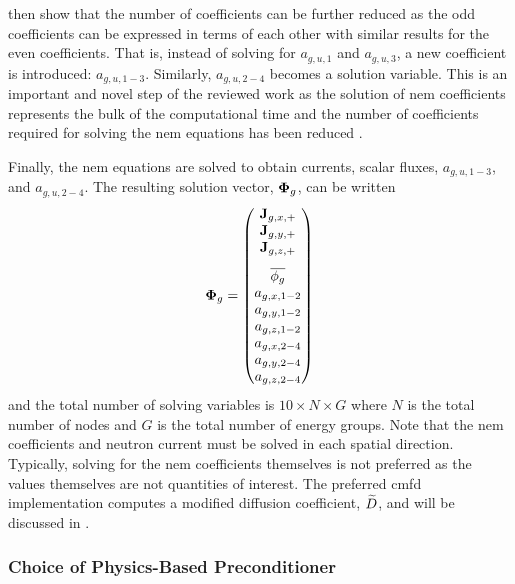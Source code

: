       \citeauthor{qe2paper} then show that the number of coefficients can be
      further reduced as the odd coefficients can be expressed in terms of
      each other with similar results for the even coefficients. That is,
      instead of solving for $a_{g,u,1}$ and $a_{g,u,3}$, a new coefficient is
      introduced: $a_{g,u,1-3}$. Similarly, $a_{g,u,2-4}$ becomes a solution
      variable. This is an important and novel step of the reviewed work as the
      solution of \gls{nem} coefficients represents the bulk of the
      computational time and the number of coefficients required for solving the
      \gls{nem} equations has been reduced \cite{qe2paper}.

      Finally, the \gls{nem} equations are solved to obtain currents, scalar
      fluxes, $a_{g,u,1-3}$, and $a_{g,u,2-4}$. The resulting solution vector,
      $\mathbf{\Phi}_g$, can be written 
      \begin{equation}
        \label{eq:solution_vector}
        \vPhi_g =
        \begin{pmatrix}
          \current_{g,x,+} \\
          \current_{g,y,+} \\
          \vspace{8pt}
          \current_{g,z,+} \\
          \overline{\phi_g} \\
          a_{g,x,1-2} \\
          a_{g,y,1-2} \\
          a_{g,z,1-2} \\
          a_{g,x,2-4} \\
          a_{g,y,2-4} \\
          a_{g,z,2-4}
        \end{pmatrix}
      \end{equation}
      and the total number of solving variables is $10 \times N \times G$ where
      $N$ is the total number of nodes and $G$ is the total number of energy
      groups. Note that the \gls{nem} coefficients and neutron current must be
      solved in each spatial direction. Typically, solving for the \gls{nem}
      coefficients themselves is not preferred as the values themselves are not
      quantities of interest.  The preferred \gls{cmfd} implementation computes
      a modified diffusion coefficient, $\widetilde{D}$, and will be discussed in
      .

    \subsubsection{Choice of Physics-Based Preconditioner}


